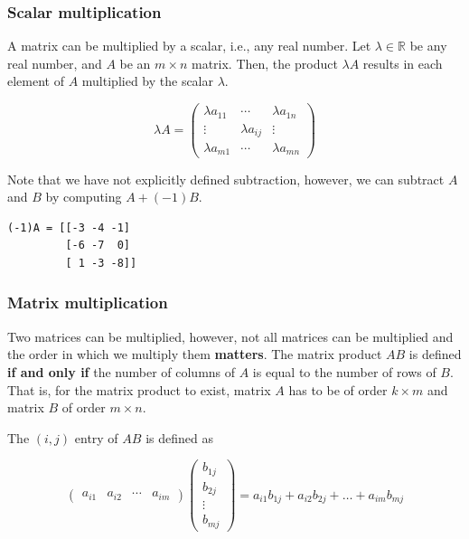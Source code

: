 \documentclass[a4paper,11pt]{article}
\theoremstyle{definition}
\theoremstyle{plain}
\begin{document}
    \subsubsection{Scalar multiplication}\label{scalar-multiplication}

A matrix can be multiplied by a scalar, i.e., any real number. Let
\(\lambda\in\mathbb{R}\) be any real number, and \(A\) be an
\(m\times n\) matrix. Then, the product \(\lambda A\) results in each
element of \(A\) multiplied by the scalar \(\lambda\).

\[
\lambda A = \begin{pmatrix} \lambda a_{11} & \cdots & \lambda a_{1n} \\ \vdots & \lambda a_{ij} & \vdots \\ \lambda a_{m1} & \cdots & \lambda a_{mn} \end{pmatrix}
\]

Note that we have not explicitly defined subtraction, however, we can
subtract \(A\) and \(B\) by computing \(A + (-1) B\).

    \begin{Verbatim}[commandchars=\\\{\}]
(-1)A = [[-3 -4 -1]
         [-6 -7  0]
         [ 1 -3 -8]]

    \end{Verbatim}

    \subsubsection{Matrix multiplication}\label{matrix-multiplication}

Two matrices can be multiplied, however, not all matrices can be
multiplied and the order in which we multiply them \textbf{matters}. The
matrix product \(AB\) is defined \textbf{if and only if} the number of
columns of \(A\) is equal to the number of rows of \(B\). That is, for
the matrix product to exist, matrix \(A\) has to be of order
\(k\times m\) and matrix \(B\) of order \(m\times n\).

The \((i,j)\) entry of \(AB\) is defined as

\[
\begin{pmatrix} a_{i1} & a_{i2} & \cdots & a_{im}\end{pmatrix} \begin{pmatrix} b_{1j} \\ b_{2j} \\ \vdots \\ b_{mj}\end{pmatrix} = a_{i1}b_{1j} + a_{i2}b_{2j} + \ldots + a_{im}b_{mj}
\]
\end{document}
